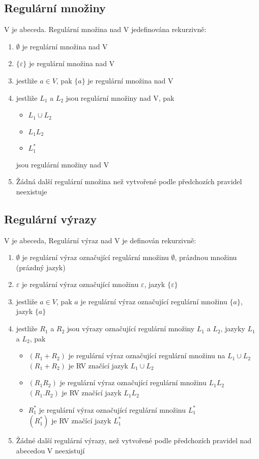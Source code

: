 \documentclass[a4wide]{report}
\begin{document}
\subsection{Regulární množiny}
V je abeceda. Regulární množina nad V jedefinována rekurzivně:
\begin{enumerate}
	\item $\emptyset$ je regulární množina nad V
	\item $\{ \varepsilon \}$ je regulární množina nad V
	\item jestliže $a \in V$, pak $\{a\}$ je regulární množina nad V
	\item jestliže $L_1$ a $L_2$ jsou regulární množiny nad V, pak
	\begin{itemize}
		\item $L_1 \cup L_2$
		\item $L_1 L_2$
		\item $L_1^*$
	\end{itemize}
	jsou regulární množiny nad V
	\item Žádná další regulární množina než vytvořené podle předchozích pravidel neexistuje
\end{enumerate}

\subsection{Regulární výrazy}
V je abeceda, Regulární výraz nad V je definován rekurzivně:
\begin{enumerate}
	\item $\emptyset$ je regulární výraz označující regulární množinu $\emptyset$, prázdnou množinu (prázdný jazyk)
	\item $\varepsilon$ je regulární výraz označující množinu $\varepsilon$, jazyk $\{ \varepsilon \}$
	\item jestliže $a \in V$, pak $a$ je regulární výraz označující regulární množinu $\{a\}$, jazyk $\{ a \}$
	\item jestliže $R_1$ a $R_2$ jsou výrazy označující regulární množiny $L_1$ a $L_2$, jazyky $L_1$ a $L_2$, pak
	\begin{itemize}
		\item $(R_1 + R_2)$ je regulární výraz označující regulární množinu na $L_1 \cup L_2$ \\
		$(R_1 + R_2)$ je RV značící jazyk $L_1 \cup L_2$
		\item $(R_1 R_2)$ je regulární výraz označující regulární množinu  $L_1 L_2$ \\
		$(R_1 . R_2)$ je RV značící jazyk $L_1 L_2$
		\item $R_1^*$ je regulární výraz označující regulární množinu $L_1^*$ \\
		$(R_1^*)$ je RV značící jazyk $L_1^*$
	\end{itemize}
	\item Žádné další regulární výrazy, než vytvořené podle předchozích pravidel nad abecedou V neexistují
\end{enumerate}
\end{document}
